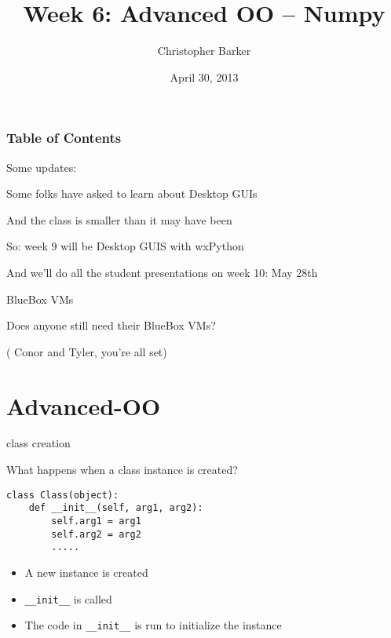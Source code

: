 \documentclass{beamer}
\title[Python Certificate: System Development]{Week 6: Advanced OO -- Numpy}
\author{Christopher Barker}
\institute{UW Continuing Education}
\date{April  30, 2013}
\begin{document}
\begin{frame}
  \titlepage
\end{frame}

\begin{frame}
\frametitle{Table of Contents}
  \tableofcontents
\end{frame}


\begin{frame}[fragile]{Some updates:}

\Large{Some folks have asked to learn about Desktop GUIs}

\vfill
\Large{And the class is smaller than it may have been}

\vfill
\Large{So: week 9 will be Desktop GUIS with wxPython}

\vfill
\Large{And we'll do all the student presentations on week 10: May 28th}


\end{frame}

\begin{frame}[fragile]{BlueBox VMs}

\Large{Does anyone still need their BlueBox VMs?}


\vfill
\large{ ( Conor and Tyler, you're all set) }

\end{frame}

\section{Advanced-OO}

\begin{frame}[fragile]{class creation}

{\Large What happens when a class instance is created?}

\vfill
\begin{verbatim}
class Class(object):
    def __init__(self, arg1, arg2):
        self.arg1 = arg1
        self.arg2 = arg2
        .....
\end{verbatim}
\vfill

\begin{itemize}
  \item A new instance is created
  \item \verb|__init__| is called
  \item The code in \verb|__init__| is run to initialize the instance
\end{itemize}
\vfill

\end{frame} 
\end{document}
